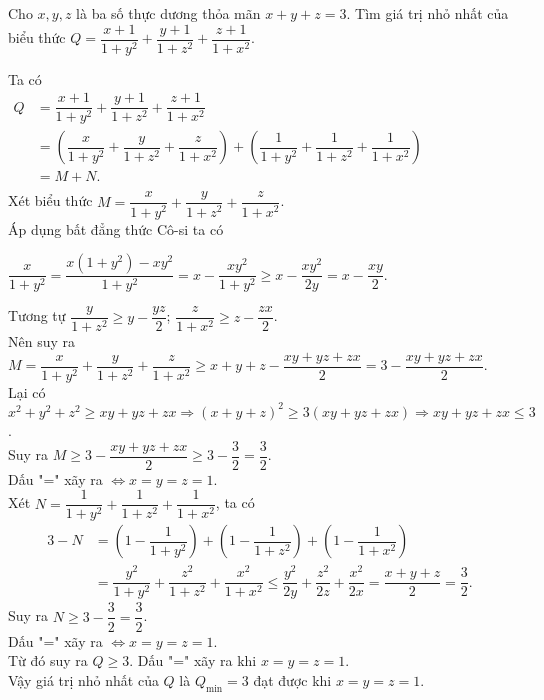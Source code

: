 \begin{bt}%
	Cho $x,y,z$ là ba số thực dương thỏa mãn $x+y+z=3$. Tìm giá trị nhỏ nhất của biểu thức 
	$Q=\dfrac{x+1}{1+y^2}+\dfrac{y+1}{1+z^2}+\dfrac{z+1}{1+x^2}.$
	\loigiai
	{
		Ta có \\ 
		$ \begin{array}{ll}
		Q & =\dfrac{x+1}{1+y^2}+\dfrac{y+1}{1+z^2}+\dfrac{z+1}{1+x^2}\\ 
		& =\left(\dfrac{x}{1+y^2}+\dfrac{y}{1+z^2}+\dfrac{z}{1+x^2}\right)+\left(\dfrac{1}{1+y^2}+\dfrac{1}{1+z^2}+\dfrac{1}{1+x^2}\right)\\
		&=M+N.\\
		\end{array}$\\
		Xét biểu thức $M=\dfrac{x}{1+y^2}+\dfrac{y}{1+z^2}+\dfrac{z}{1+x^2}$. \\
		Áp dụng bất đẳng thức Cô-si ta có \\
		\begin{center}
			$\dfrac{x}{1+y^2}=\dfrac{x(1+y^2)-xy^2}{1+y^2}=x-\dfrac{xy^2}{1+y^2}\geq x-\dfrac{xy^2}{2y}=x-\dfrac{xy}{2}.$
		\end{center}
		Tương tự  $\dfrac{y}{1+z^2}\geq y-\dfrac{yz}{2}$;  $\dfrac{z}{1+x^2}\geq z-\dfrac{zx}{2}$.\\ 
		Nên suy ra \\
		$M=\dfrac{x}{1+y^2}+\dfrac{y}{1+z^2}+\dfrac{z}{1+x^2}\geq x+y+z-\dfrac{xy+yz+zx}{2}=3-\dfrac{xy+yz+zx}{2}$.\\
		Lại có\\
		$x^2+y^2+z^2\geq xy+yz+zx\Rightarrow (x+y+z)^2\geq 3(xy+yz+zx)\Rightarrow xy+yz+zx\leq 3$.\\
		Suy ra $M\geq 3-\dfrac{xy+yz+zx}{2}\geq 3-\dfrac{3}{2}=\dfrac{3}{2}$.\\
		Dấu "=" xãy ra $\Leftrightarrow x=y=z=1$.\\
		Xét $N=\dfrac{1}{1+y^2}+\dfrac{1}{1+z^2}+\dfrac{1}{1+x^2}$, ta có
		\begin{align*}
		3-N&=\left(1-\dfrac{1}{1+y^2}\right)+\left(1-\dfrac{1}{1+z^2}\right)+\left(1-\dfrac{1}{1+x^2}\right)\\
		&=\dfrac{y^2}{1+y^2}+\dfrac{z^2}{1+z^2}+\dfrac{x^2}{1+x^2}\leq \dfrac{y^2}{2y}+\dfrac{z^2}{2z}+\dfrac{x^2}{2x}=\dfrac{x+y+z}{2}=\dfrac{3}{2}.
		\end{align*}
		Suy ra $N\geq 3-\dfrac{3}{2}=\dfrac{3}{2}$.\\
		Dấu "=" xãy ra $\Leftrightarrow x=y=z=1$.\\
		Từ đó suy ra  $Q\geq 3$. Dấu "=" xãy ra khi $x=y=z=1$.\\
		Vậy giá trị nhỏ nhất của $Q$ là  $Q_{\min}=3$ đạt được khi $x=y=z=1$.
	}
\end{bt}

